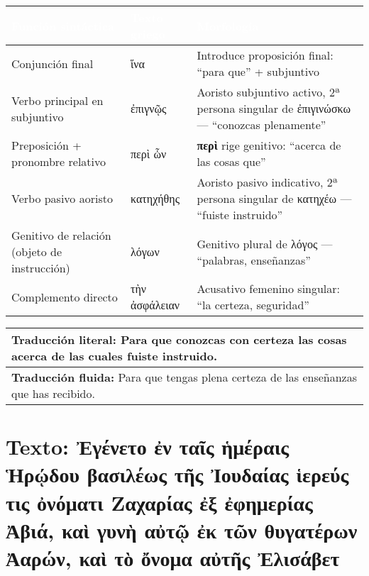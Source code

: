 \documentclass[a4paper,12pt]{article}
\begin{document}
\begin{tabularx}{\textwidth}{|Y|Y|Y|}
	\textcolor{white}{\textbf{Función sintáctica}} & \textcolor{white}{\textbf{Texto griego}} & \textcolor{white}{\textbf{Morfología}} \\
	\hline
	Conjunción final & \textgreek{ἵνα} & Introduce proposición final: “para que” + subjuntivo \\
	\hline
	Verbo principal en subjuntivo & \textgreek{ἐπιγνῷς} & Aoristo subjuntivo activo, 2ª persona singular de \textgreek{ἐπιγινώσκω} — “conozcas plenamente” \\
	\hline
	Preposición + pronombre relativo & \textgreek{περὶ ὧν} & \textbf{περὶ} rige genitivo: “acerca de las cosas que” \\
	\hline
	Verbo pasivo aoristo & \textgreek{κατηχήθης} & Aoristo pasivo indicativo, 2ª persona singular de \textgreek{κατηχέω} — “fuiste instruido” \\
	\hline
	Genitivo de relación (objeto de instrucción) & \textgreek{λόγων} & Genitivo plural de \textgreek{λόγος} — “palabras, enseñanzas” \\
	\hline
	Complemento directo & \textgreek{τὴν ἀσφάλειαν} & Acusativo femenino singular: “la certeza, seguridad” \\
	\hline
\end{tabularx}

\vspace{0.5cm}

\begin{tabularx}{\textwidth}{|Y|}
	\hline
	\textbf{Traducción literal:} Para que conozcas con certeza las cosas acerca de las cuales fuiste instruido. \\
	\hline
	\textbf{Traducción fluida:} Para que tengas plena certeza de las enseñanzas que has recibido. \\
	\hline
\end{tabularx}


\section{Texto: \textgreek{Ἐγένετο ἐν ταῖς ἡμέραις Ἡρῴδου βασιλέως τῆς Ἰουδαίας ἱερεύς τις ὀνόματι Ζαχαρίας ἐξ ἐφημερίας Ἀβιά, καὶ γυνὴ αὐτῷ ἐκ τῶν θυγατέρων Ἀαρών, καὶ τὸ ὄνομα αὐτῆς Ἐλισάβετ}}
\end{document}

